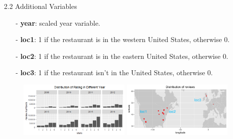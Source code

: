 \documentclass[10pt]{beamer}
\begin{document}
\begin{frame}{2.2 Additional Variables}

\begin{itemize}
	\item[-] \textbf{year}: scaled year variable.
	
	\item[-] \textbf{loc1}: 1 if the restaurant is in the western United States, otherwise 0.
	
	\item[-] \textbf{loc2}: 1 if the restaurant is in the eastern United States, otherwise 0.
	
	\item[-] \textbf{loc3}: 1 if the restaurant isn't in the United States, otherwise 0.
	
\end{itemize}


\begin{figure}[htbp]
\centering
\begin{minipage}[t]{0.5\textwidth}
\centering
\includegraphics[width=5.4cm,height=2.7cm]{../image/year.png}

\end{minipage}
\begin{minipage}[t]{0.48\textwidth}
\centering
\includegraphics[width=5.4cm,height=2.7cm]{../image/worldmap.png}

\end{minipage}
\end{figure}

\end{frame}
\end{document}
